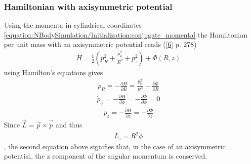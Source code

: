 \documentclass[letterpaper,10pt,english]{sphinxmanual}
\begin{document}
\subsubsection{Hamiltonian with axisymmetric potential}
\label{\detokenize{NBodySimulation/Initialization:hamiltonian-with-axisymmetric-potential}}
\sphinxAtStartPar
Using the momenta in cylindrical coordinates \eqref{equation:NBodySimulation/Initialization:conjugate_momenta} the Hamiltonian per unit mass with an axisymmetric potential reads ({[}\hyperlink{cite.NBodySimulation/Appendix:id17}{6}{]} p. 278)
\begin{equation}\label{equation:NBodySimulation/Initialization:hamilton_1}
\begin{split}H = \frac{1}{2}\left( p_{R}^2+\frac{p_\phi^2}{R^2}+p_z^2 \right)+\Phi\left(R,z\right)\end{split}
\end{equation}
\sphinxAtStartPar
using Hamilton’s equations gives
\begin{equation}\label{equation:NBodySimulation/Initialization:hamilton_2_1}
\begin{split}\dot{p}_{R} = -\frac{\partial H}{\partial R} = \frac{p_\phi^2}{R^3}-\frac{\partial \Phi }{\partial R}\end{split}
\end{equation}\begin{equation}\label{equation:NBodySimulation/Initialization:hamilton_2_2}
\begin{split}\dot{p}_{\phi} = -\frac{\partial H}{\partial \phi} = -\frac{\partial \Phi }{\partial \phi} = 0\end{split}
\end{equation}\begin{equation}\label{equation:NBodySimulation/Initialization:hamilton_2_3}
\begin{split}\dot{p}_{z} = -\frac{\partial H}{\partial z} = -\frac{\partial \Phi }{\partial z}\end{split}
\end{equation}
\sphinxAtStartPar
Since \(\vec{L} = \vec{p} \times \vec{\dot{p}}\) and thus
\begin{equation}\label{equation:NBodySimulation/Initialization:angular_momentum}
\begin{split}L_z = R^2\dot{\phi}\end{split}
\end{equation}
\sphinxAtStartPar
, the second equation above signifies that, in the case of an axisymmetric potential, the z component of the angular momentum is conserved.
\end{document}
